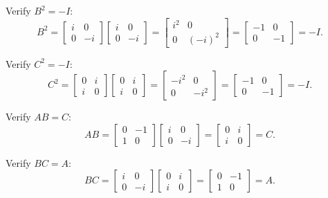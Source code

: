 \documentclass[12pt]{amsart}
\theoremstyle{definition}
\numberwithin{equation}{section}
\begin{document}
\begin{exercise}{6}
    \noindent Verify \(B^2 = -I\):
    \[
    B^2 = \begin{bmatrix} i & 0 \\ 0 & -i \end{bmatrix} \begin{bmatrix} i & 0 \\ 0 & -i \end{bmatrix} = \begin{bmatrix} i^2 & 0 \\ 0 & {(-i)}^2 \end{bmatrix} = \begin{bmatrix} -1 & 0 \\ 0 & -1 \end{bmatrix} = -I.
    \]

    \noindent Verify \(C^2 = -I\):
    \[
    C^2 = \begin{bmatrix} 0 & i \\ i & 0 \end{bmatrix} \begin{bmatrix} 0 & i \\ i & 0 \end{bmatrix} = \begin{bmatrix} -i^2 & 0 \\ 0 & -i^2 \end{bmatrix} = \begin{bmatrix} -1 & 0 \\ 0 & -1 \end{bmatrix} = -I.
    \]

    \noindent Verify \(AB = C\):
    \[
    AB = \begin{bmatrix} 0 & -1 \\ 1 & 0 \end{bmatrix} \begin{bmatrix} i & 0 \\ 0 & -i \end{bmatrix} = \begin{bmatrix} 0 & i \\ i & 0 \end{bmatrix} = C.
    \]

    \noindent Verify \(BC = A\):
    \[
    BC = \begin{bmatrix} i & 0 \\ 0 & -i \end{bmatrix} \begin{bmatrix} 0 & i \\ i & 0 \end{bmatrix} = \begin{bmatrix} 0 & -1 \\ 1 & 0 \end{bmatrix} = A.
    \]


\end{exercise}
\end{document}
